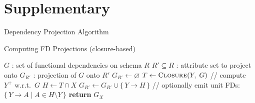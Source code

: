 \documentclass[UTF8]{beamer}
\begin{document}
\section{Supplementary}

\begin{frame}{Dependency Projection Algorithm}
\begin{algorithm}[H]
\scriptsize
\caption{Computing FD Projections (closure-based)}
\label{algorithm:algo}
\label{alg:fd-projection-closures}
\begin{algorithmic}[1]
\REQUIRE $G$ : set of functional dependencies on schema $R$
\REQUIRE $R' \subseteq R$ : attribute set to project onto
\ENSURE $G_{R'}$ : projection of $G$ onto $R'$
\STATE $G_{R'} \gets \varnothing$
    \STATE $T \gets \textsc{Closure}(Y,\; G)$ \hfill// compute $Y^+$ w.r.t.\ $G$
    \STATE $H \gets T \cap X$
    \STATE $G_{R'} \gets G_{R'} \cup \{\, Y \to H \,\}$ \hfill// optionally emit unit FDs: $\{\,Y\to A \mid A \in H\setminus Y\,\}$
\ENDFOR
\STATE \textbf{return} $G_X$
\end{algorithmic}
\end{algorithm}

\end{frame}
\end{document}
